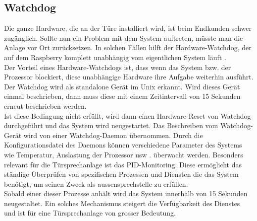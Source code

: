 \subsection{Watchdog}
\label{kap:watchdog}
Die ganze Hardware, die an der Türe installiert wird, ist beim Endkunden schwer zugänglich. Sollte nun ein Problem mit dem System auftreten, müsste man die Anlage vor Ort zurücksetzen. In solchen Fällen hilft der Hardware-Watchdog, der auf dem Raspberry komplett unabhängig vom eigentlichen System läuft \cite{watchdog2}.
\\
Der Vorteil eines Hardware-Watchdogs ist, dass wenn das System bzw. der Prozessor blockiert, diese unabhängige Hardware ihre Aufgabe weiterhin ausführt. Der Watchdog wird als standalone Gerät im Unix erkannt. Wird dieses Gerät einmal beschrieben, dann muss diese mit einem Zeitintervall von 15 Sekunden erneut beschrieben werden.
\\
Ist diese Bedingung nicht erfüllt, wird dann einen Hardware-Reset von Watchdog durchgeführt und das System wird neugestartet. Das Beschreiben vom Watchdog-Gerät wird von einer Watchdog-Daemon übernommen. Durch die Konfigurationsdatei des Daemons können verschiedene Parameter des Systems wie Temperatur, Auslastung der Prozessor usw \cite{watchdog1}. überwacht werden. Besonders relevant für die Türsprechanlage ist das PID-Monitoring. Diese ermöglicht das ständige Überprüfen von spezifischen Prozessen und Diensten die das System benötigt, um seinen Zweck als \gls{aussensprechstelle} zu erfüllen. 
\\
Sobald einer dieser Prozesse anhält wird das System innerhalb von 15 Sekunden neugestaltet. Ein solches Mechanismus steigert die Verfügbarkeit des Dienstes und ist für eine Türsprechanlage von grosser Bedeutung.


\newpage